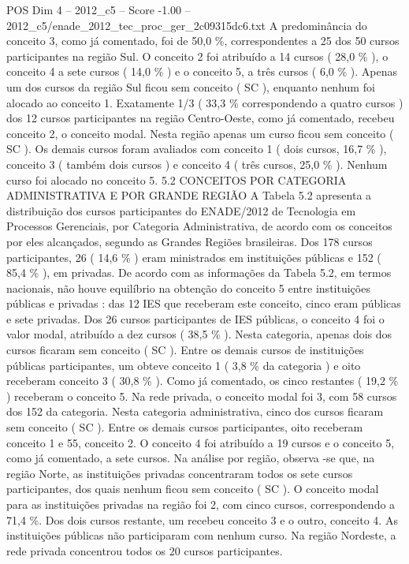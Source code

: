 \begin{textsample}{POS Dim 4 – 2012\_c5 – Score -1.00 – 2012\_c5/enade\_2012\_tec\_proc\_ger\_2c09315dc6.txt}
A predominância do conceito 3, como já comentado, foi de 50,0 \%, correspondentes a 25 dos 50 cursos participantes na região Sul.
O conceito 2 foi atribuído a 14 cursos ( 28,0 \% ), o conceito 4 a sete cursos ( 14,0 \% ) e o conceito 5, a três cursos ( 6,0 \% ).
Apenas um dos cursos da região Sul ficou sem conceito ( SC ), enquanto nenhum foi alocado ao conceito 1.
Exatamente 1/3 ( 33,3 \% correspondendo a quatro cursos ) dos 12 cursos participantes na região Centro-Oeste, como já comentado, recebeu conceito 2, o conceito modal.
Nesta região apenas um curso ficou sem conceito ( SC ).
Os demais cursos foram avaliados com conceito 1 ( dois cursos, 16,7 \% ), conceito 3 ( também dois cursos ) e conceito 4 ( três cursos, 25,0 \% ).
Nenhum curso foi alocado no conceito 5. 5.2 CONCEITOS POR CATEGORIA ADMINISTRATIVA E POR GRANDE REGIÃO A Tabela 5.2 apresenta a distribuição dos cursos participantes do ENADE/2012 de Tecnologia em Processos Gerenciais, por Categoria Administrativa, de acordo com os conceitos por eles alcançados, segundo as Grandes Regiões brasileiras.
Dos 178 cursos participantes, 26 ( 14,6 \% ) eram ministrados em instituições públicas e 152 ( 85,4 \% ), em privadas.
De acordo com as informações da Tabela 5.2, em termos nacionais, não houve equilíbrio na obtenção do conceito 5 entre instituições públicas e privadas : das 12 IES que receberam este conceito, cinco eram públicas e sete privadas.
Dos 26 cursos participantes de IES públicas, o conceito 4 foi o valor modal, atribuído a dez cursos ( 38,5 \% ).
Nesta categoria, apenas dois dos cursos ficaram sem conceito ( SC ).
Entre os demais cursos de instituições públicas participantes, um obteve conceito 1 ( 3,8 \% da categoria ) e oito receberam conceito 3 ( 30,8 \% ).
Como já comentado, os cinco restantes ( 19,2 \% ) receberam o conceito 5.
Na rede privada, o conceito modal foi 3, com 58 cursos dos 152 da categoria.
Nesta categoria administrativa, cinco dos cursos ficaram sem conceito ( SC ).
Entre os demais cursos participantes, oito receberam conceito 1 e 55, conceito 2.
O conceito 4 foi atribuído a 19 cursos e o conceito 5, como já comentado, a sete cursos.
Na análise por região, observa -se que, na região Norte, as instituições privadas concentraram todos os sete cursos participantes, dos quais nenhum ficou sem conceito ( SC ).
O conceito modal para as instituições privadas na região foi 2, com cinco cursos, correspondendo a 71,4 \%.
Dos dois cursos restante, um recebeu conceito 3 e o outro, conceito 4.
As instituições públicas não participaram com nenhum curso.
Na região Nordeste, a rede privada concentrou todos os 20 cursos participantes.

\end{textsample}

